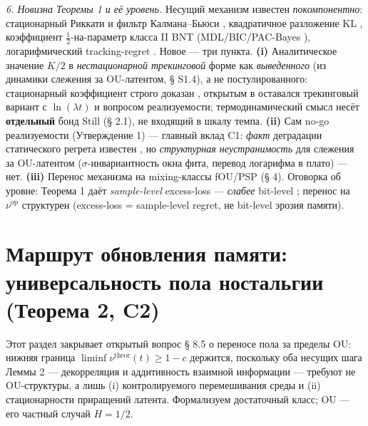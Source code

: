 \documentclass[12pt]{iopart}
\begin{document}
\emph{6. Новизна Теоремы 1 и её уровень.} Несущий механизм известен \emph{покомпонентно}: стационарный Риккати и фильтр Калмана--Бьюси \cite{KalmanBucy1961,AndersonMoore1979}, квадратичное разложение KL \cite{ClarkeBarron1990}, коэффициент \(\tfrac12\)-на-параметр класса II BNT \cite{BialekNemenmanTishby2001} (MDL/BIC/PAC-Bayes \cite{Rissanen1986,Schwarz1978,McAllester1999}), логарифмический tracking-regret \cite{Zinkevich2003,Hazan2007}. Новое --- три пункта. \textbf{(i)} Аналитическое значение \(K/2\) в \emph{нестационарной трекинговой} форме как \emph{выведенного} (из динамики слежения за OU-латентом, § S1.4), а не постулированного: стационарный коэффициент строго доказан \cite{ClarkeBarron1990,Rissanen1986}, открытым в \cite{Andriishin2026b} оставался трекинговый вариант с \(\ln(\lambda t)\) и вопросом реализуемости; термодинамический смысл несёт \textbf{отдельный} бонд Still (§ 2.1), не входящий в шкалу темпа. \textbf{(ii)} Сам no-go реализуемости (Утверждение 1) --- главный вклад C1: \emph{факт} деградации статического регрета известен \cite{HazanSeshadhri2009,Daniely2015}, но \emph{структурная неустранимость} для слежения за OU-латентом (\(\sigma\)-инвариантность окна фита, перевод логарифма в плато) --- нет. \textbf{(iii)} Перенос механизма на mixing-классы fOU/PSP (§ 4). Оговорка об уровне: Теорема 1 даёт \emph{sample-level} excess-loss --- \emph{слабее} bit-level \cite{Andriishin2026b}; перенос на \(\nu^{\text{op}}\) структурен (excess-loss = sample-level regret, не bit-level эрозия памяти).



\section{Маршрут обновления памяти: универсальность пола ностальгии (Теорема 2, C2)}\label{ux43cux430ux440ux448ux440ux443ux442-ux43eux431ux43dux43eux432ux43bux435ux43dux438ux44f-ux43fux430ux43cux44fux442ux438-ux443ux43dux438ux432ux435ux440ux441ux430ux43bux44cux43dux43eux441ux442ux44c-ux43fux43eux43bux430-ux43dux43eux441ux442ux430ux43bux44cux433ux438ux438-ux442ux435ux43eux440ux435ux43cux430-2-c2}



Этот раздел закрывает открытый вопрос § 8.5 \cite{Andriishin2026b} о переносе пола за пределы OU: нижняя граница \(\liminf\nu^{\text{theor}}(t) \ge 1-c\) держится, поскольку оба несущих шага Леммы 2 --- декорреляция и аддитивность взаимной информации --- требуют не OU-структуры, а лишь (i) контролируемого перемешивания среды и (ii) стационарности приращений латента. Формализуем достаточный класс; OU --- его частный случай \(H = 1/2\).
\end{document}
